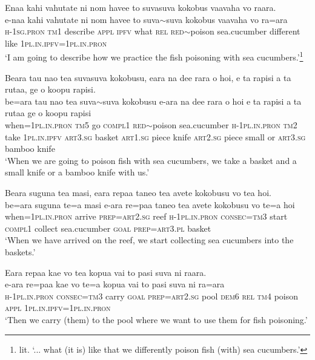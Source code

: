 \ea\label{ex:text31-1}
Enaa kahi vahutate ni nom havee to suvasuva kokobus vaavaha vo raara.\\
\gll e-naa	kahi	vahutate	ni	nom	havee	to	suva{$\sim$}suva	kokobus	vaavaha	vo	ra=ara\\
     \textsc{h}-1\textsc{sg}.\textsc{pron}	\textsc{tm}1	describe	\textsc{appl}	\textsc{ipfv}	what	\textsc{rel}	\textsc{red}{$\sim$}poison	sea.cucumber	different	like	1\textsc{pl}.\textsc{in}.\textsc{ipfv}=1\textsc{pl}.\textsc{in}.\textsc{pron}\\
\glt `I am going to describe how we practice the fish poisoning with sea cucumbers.'\footnote{lit. `... what (it is) like that we differently poison fish (with) sea cucumbers.'}
\z

\ea\label{ex:text31-2}
Beara tau nao tea suvasuva kokobusu, eara na dee rara o hoi, e ta rapisi a ta rutaa, ge o koopu rapisi.\\
\gll be=ara	tau	nao	tea	suva{$\sim$}suva	kokobusu	e-ara	na	dee	rara	o	hoi	e	ta	rapisi	a	ta	rutaa	ge	o	koopu	rapisi\\
     when=1\textsc{pl}.\textsc{in}.\textsc{pron}	\textsc{tm}5	go	\textsc{compl}1	\textsc{red}{$\sim$}poison	sea.cucumber	\textsc{h}-1\textsc{pl}.\textsc{in}.\textsc{pron}	\textsc{tm}2	take	1\textsc{pl}.\textsc{in}.\textsc{ipfv}	\textsc{art}3.\textsc{sg}	basket	\textsc{art}1.\textsc{sg}	piece	knife	\textsc{art}2.\textsc{sg}	piece	small	or	\textsc{art}3.\textsc{sg}	bamboo	knife\\
\glt `When we are going to poison fish with sea cucumbers, we take a basket and a small knife or a bamboo knife with us.'
\z

\ea\label{ex:text31-3}
Beara suguna tea masi, eara repaa taneo tea avete kokobusu vo tea hoi.\\
\gll be=ara	suguna	te=a	masi	e-ara	re=paa	taneo	tea	avete	kokobusu	vo	te=a	hoi\\
     when=1\textsc{pl}.\textsc{in}.\textsc{pron}	arrive	\textsc{prep}=\textsc{art}2.\textsc{sg}	reef	\textsc{h}-1\textsc{pl}.\textsc{in}.\textsc{pron}	\textsc{consec}=\textsc{tm}3	start	\textsc{compl}1	collect	sea.cucumber	\textsc{goal}	\textsc{prep}=\textsc{art}3.\textsc{pl}	basket\\
\glt `When we have arrived on the reef, we start collecting sea cucumbers into the baskets.'
\z

\largerpage
\ea\label{ex:text31-4}
Eara repaa kae vo tea kopua vai to pasi suva ni raara.\\
\gll e-ara	re=paa	kae	vo	te=a	kopua	vai	to	pasi	suva	ni	ra=ara\\
     \textsc{h}-1\textsc{pl}.\textsc{in}.\textsc{pron}	\textsc{consec}=\textsc{tm}3	carry	\textsc{goal}	\textsc{prep}=\textsc{art}2.\textsc{sg}	pool	\textsc{dem}6	\textsc{rel}	\textsc{tm}4	poison	\textsc{appl}	1\textsc{pl}.\textsc{in}.\textsc{ipfv}=1\textsc{pl}.\textsc{in}.\textsc{pron}\\
\glt `Then we carry (them) to the pool where we want to use them for fish poisoning.'
\z

